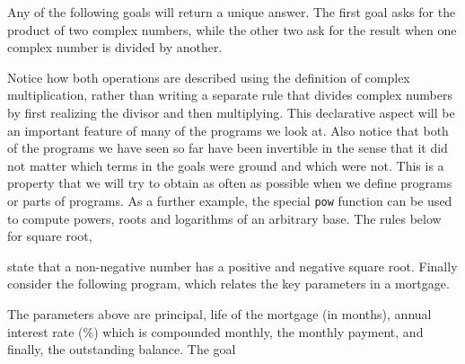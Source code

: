 \noindent
Any of the following goals will return a unique answer. The first goal asks
for the product of two complex numbers, while the other two ask for the
result when one complex number is divided by another. 


\noindent
Notice how both
operations are described using the definition of complex multiplication,
rather than writing a separate rule that divides complex numbers by first
realizing the divisor and then multiplying. This declarative aspect will be an
important
feature of many of the programs we look at. Also notice that both of the 
programs we have seen so far have been invertible in the sense that it did
not matter which terms in the goals were ground and which were not. This is a
property that we will try to obtain as often as possible when we define
programs or parts of programs. 
As a further example,
the special {\tt pow} function can 
be used to compute powers, roots and logarithms
of an arbitrary base. The rules below for square root,


\noindent
state that a non-negative number has a positive and negative square root.
Finally consider the following program, which relates 
the key parameters in a mortgage.


\noindent
The parameters above are principal, life of the mortgage (in months),
annual interest rate (\%) which is compounded monthly,
the monthly payment, and finally, the outstanding balance.
The goal


